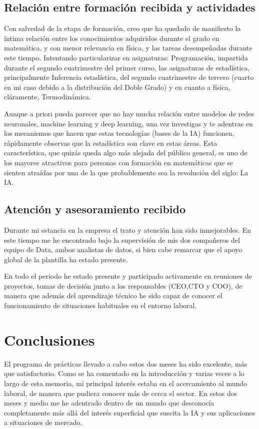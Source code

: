 \section{Relación entre formación recibida y actividades}
\label{Relacion entre formacion recibida y actividades}
%
%
%
Con salvedad de la etapa de formación, creo que ha quedado de manifiesto la íntima relación entre los conocimientos adquiridos durante el grado en matemática, y con menor relevancia en física, y las tareas desempeñadas durante este tiempo. Intentando particularizar en asignaturas: Programación, impartida durante el segundo cuatrimestre del primer curso, las asignaturas de estadística, principalmente Inferencia estadística, del segundo cuatrimestre de tercero (cuarto en mi caso debido a la distribución del Doble Grado) y en cuanto a física, cláramente, Termodinámica.

Aunque a priori pueda parecer que no hay mucha relación entre modelos de redes neuronales, machine learning y deep learning, una vez investigas y te adentras en los mecanismos que hacen que estas tecnologías (bases de la IA) funcionen, rápidamente observas que la estadística son clave en estas áreas. Esta característica, que quizás queda algo más alejada del público general, es uno de los mayores atractivos para personas con formación en matemáticas que se sienten atraídas por una de la que probablemente sea la revolución del siglo: La IA.
%
%
\section{Atención y asesoramiento recibido} \label{Atencion y asesoramiento recibido}
%
%
Durante mi estancia en la empresa el trato y atención han sido inmejorables. En este tiempo me he encontrado bajo la supervisión de mis dos compañeros del equipo de Data, ambos analistas de datos, si bien cabe remarcar que el apoyo global de la plantilla ha estado presente.

En todo el periodo he estado presente y participado activamente en reuniones de proyectos, tomas de decisión junto a los responsables (CEO,CTO y COO), de manera que además del aprendizaje técnico he sido capaz de conocer el funcionamiento de situaciones habituales en el entorno laboral.
%
%
\chapter{Conclusiones}
%
%
El programa de prácticas llevado a cabo estos dos meses ha sido excelente, más que satisfactorio. Como se ha comentado en la introducción y varias veces a lo largo de esta memoria, mi principal interés estaba en el acercamiento al mundo laboral, de manera que pudiera conocer más de cerca el sector. En estos dos meses y medio me he adentrado dentro de un mundo que desconocía completamente más allá del interés superficial que suscita la IA y sus aplicaciones a situaciones de mercado.

